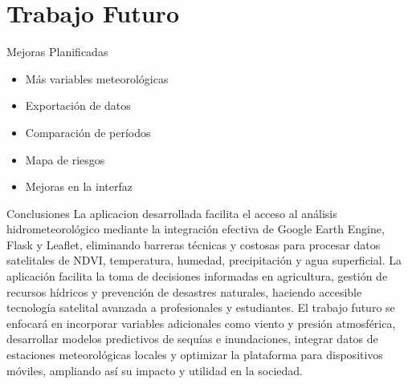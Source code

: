 \documentclass[aspectratio=169,10pt]{beamer}
\begin{document}



\section{Trabajo Futuro}



\begin{frame}{Mejoras Planificadas}

\begin{center}



\end{center}

\begin{itemize}

\item Más variables meteorológicas

\item Exportación de datos

\item Comparación de períodos

\item Mapa de riesgos

\item Mejoras en la interfaz

\end{itemize}

\end{frame}






\begin{frame}{Conclusiones}
\justifying
La aplicacion desarrollada facilita el acceso al análisis hidrometeorológico mediante la integración efectiva de Google Earth Engine, Flask y Leaflet, eliminando barreras técnicas y costosas para procesar datos satelitales de NDVI, temperatura, humedad, precipitación y agua superficial. La aplicación facilita la toma de decisiones informadas en agricultura, gestión de recursos hídricos y prevención de desastres naturales, haciendo accesible tecnología satelital avanzada a profesionales y estudiantes. El trabajo futuro se enfocará en incorporar variables adicionales como viento y presión atmosférica, desarrollar modelos predictivos de sequías e inundaciones, integrar datos de estaciones meteorológicas locales y optimizar la plataforma para dispositivos móviles, ampliando así su impacto y utilidad en la sociedad.

\end{frame}
\end{document}
